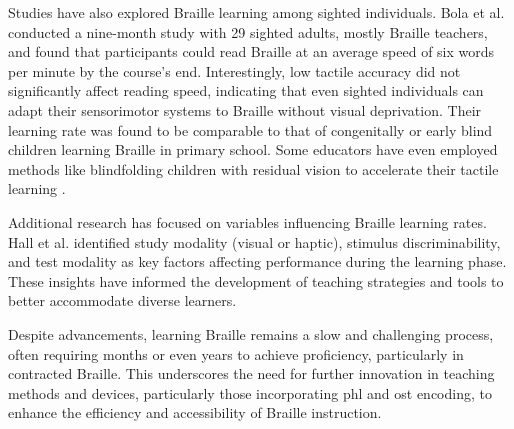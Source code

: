 Studies have also explored Braille learning among sighted individuals. Bola et al. \cite{Bola2016} conducted a nine-month study with 29 sighted adults, mostly Braille teachers, and found that participants could read Braille at an average speed of six words per minute by the course’s end. Interestingly, low tactile accuracy did not significantly affect reading speed, indicating that even sighted individuals can adapt their sensorimotor systems to Braille without visual deprivation. Their learning rate was found to be comparable to that of congenitally or early blind children learning Braille in primary school. Some educators have even employed methods like blindfolding children with residual vision to accelerate their tactile learning \cite{Bola2016}.

Additional research has focused on variables influencing Braille learning rates. Hall et al. \cite{Hall1987} identified study modality (visual or haptic), stimulus discriminability, and test modality as key factors affecting performance during the learning phase. These insights have informed the development of teaching strategies and tools to better accommodate diverse learners.

Despite advancements, learning Braille remains a slow and challenging process, often requiring months or even years to achieve proficiency, particularly in contracted Braille. This underscores the need for further innovation in teaching methods and devices, particularly those incorporating \gls{phl} and \gls{ost} encoding, to enhance the efficiency and accessibility of Braille instruction.





